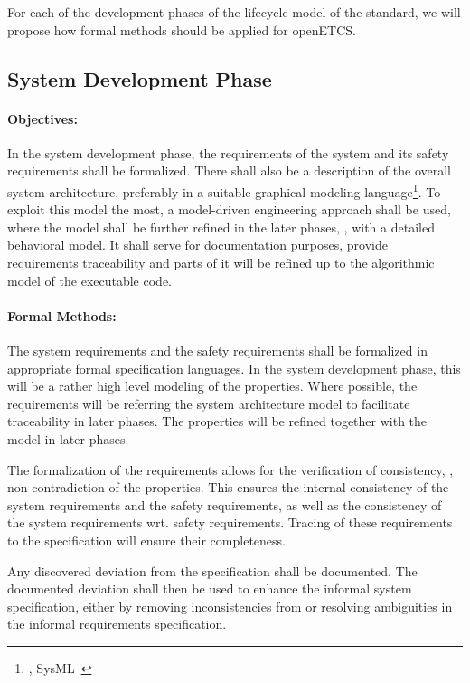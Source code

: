 For each of the development phases of the lifecycle model of the standard, we
will propose how formal methods should be applied for openETCS.

\subsection{System Development Phase}
\label{sec:syst-devel-phase}

\paragraph{Objectives:}
\label{sec:sys-dev-objective}
In the system development phase, the requirements of the system and its safety
requirements shall be formalized. There shall also be a description of the
overall system architecture, preferably in a suitable graphical modeling
language\footnote{\eg, SysML~\cite{SysMLSpec}}. To exploit this model the most,
a model-driven engineering approach shall be used, where the model shall be
further refined in the later phases, \eg, with a detailed behavioral model. It
shall serve for documentation purposes, provide requirements traceability and
parts of it will be refined up to the algorithmic model of the executable code.

\paragraph{Formal Methods:}
\label{sec:sys-dev-formal-methods}
The system requirements and the safety requirements shall be formalized in
appropriate formal specification languages. In the system development phase,
this will be a rather high level modeling of the properties. Where possible, the
requirements will be referring the system architecture model to facilitate
traceability in later phases. The properties will be refined together with the
model in later phases.

The formalization of the requirements allows for the verification of
consistency, \eg, non-contradiction of the properties. This ensures the internal
consistency of the system requirements and the safety requirements, as well as
the consistency of the system requirements wrt. safety requirements. Tracing of
these requirements to the specification will ensure their completeness.

Any discovered deviation from the specification shall be documented. The
documented deviation shall then be used to enhance the informal system
specification, either by removing inconsistencies from or resolving ambiguities
in the informal requirements specification.

